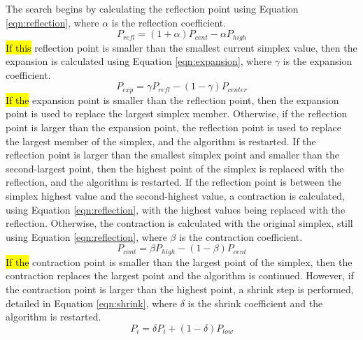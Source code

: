 \documentclass[metals,article,accept,pdftex,moreauthors]{Definitions/mdpi}
\begin{document}
The search begins by calculating the reflection point using Equation \eqref{eqn:reflection}, 
where $\alpha$ is the reflection coefficient.
	\begin{equation}\label{eqn:reflection}
		P_{refl} = (1 + \alpha) P_{cent} - \alpha P_{high}
	\end{equation}
\hl{If this} reflection point is smaller than the smallest current simplex value, then the expansion is calculated using Equation \eqref{eqn:expansion}, where $\gamma$ is the expansion coefficient.
	\begin{equation}\label{eqn:expansion}
		P_{exp} = \gamma P_{refl} - (1 - \gamma) P_{center}
	\end{equation}
\hl{If the} expansion point is smaller than the reflection point, then the expansion point is used to replace the largest simplex member.  Otherwise, if the reflection point is larger than the expansion point, the reflection point is used to replace the largest member of the simplex, and the algorithm is restarted.
If the reflection point is larger than the smallest simplex point and smaller than the 
second-largest point, then the highest point of the simplex is replaced with the reflection, 
and the algorithm is restarted. 
If the reflection point is between the simplex highest value and the second-highest value, a 
contraction is calculated, using Equation \eqref{eqn:reflection}, with the highest values 
being replaced with the reflection.  Otherwise, the contraction is calculated with the 
original simplex, still using Equation \eqref{eqn:reflection}, where $\beta$ is the 
contraction coefficient.
\begin{equation}
\label{eqn:contraction}
P_{cont} = \beta P_{high} - (1 - \beta) P_{cent}	
\end{equation}
\hl{If the} contraction point is smaller than the largest point of the simplex, then the 
contraction replaces the largest point and the algorithm is continued.
However, if the contraction point is larger than the highest point, a shrink step is performed, detailed in Equation \eqref{eqn:shrink}, where $\delta$ is the shrink coefficient and the algorithm is restarted.
\begin{equation}
\label{eqn:shrink}
P_{i} = \delta P_{i} + (1 - \delta) P_{low}
\end{equation}
\end{document}
